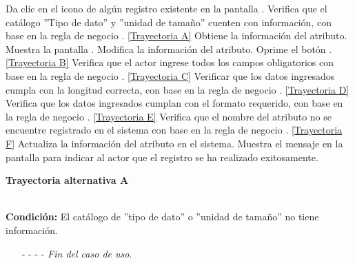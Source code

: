 	\begin{UCtrayectoria}
		\UCpaso[\UCactor] Da clic en el icono \editar de algún registro existente en la pantalla .
		\UCpaso[\UCsist] Verifica que el catálogo ''Tipo de dato'' y ''unidad de tamaño'' cuenten con información, con base en la regla de negocio . \hyperlink{CU7-1-1-2:TAA}{[Trayectoria A]}
		\UCpaso[\UCsist] Obtiene la información del atributo.
		\UCpaso[\UCsist] Muestra la pantalla .
		\UCpaso[\UCactor] Modifica la información del atributo. \label{CU7.1.2-P4}
		\UCpaso[\UCactor] Oprime el botón . \hyperlink{CU7-1-1-2:TAB}{[Trayectoria B]}
		\UCpaso[\UCsist] Verifica que el actor ingrese todos los campos obligatorios con base en la regla de negocio . \hyperlink{CU7-1-1-2:TAC}{[Trayectoria C]}
		\UCpaso[\UCsist] Verificar que los datos ingresados cumpla con la longitud correcta, con base en la regla de negocio . \hyperlink{CU7-1-1-2:TAD}{[Trayectoria D]}
		\UCpaso[\UCsist] Verifica que los datos ingresados cumplan con el formato requerido, con base en la regla de negocio . \hyperlink{CU7-1-1-2:TAE}{[Trayectoria E]}
		\UCpaso[\UCsist] Verifica que el nombre del atributo no se encuentre registrado en el sistema con base en la regla de negocio . \hyperlink{CU7-1-1-2:TAF}{[Trayectoria F]}
		\UCpaso[\UCsist] Actualiza la información del atributo en el sistema.
		\UCpaso[\UCsist] Muestra el mensaje  en la pantalla  para indicar al actor que el registro se ha realizado exitosamente.
	\end{UCtrayectoria}		
\hypertarget{CU7-1-1-2:TAA}{\textbf{Trayectoria alternativa A}}\\
\noindent \textbf{Condición:} El catálogo de ''tipo de dato'' o ''unidad de tamaño'' no tiene información.
\begin{enumerate}
	\UCpaso[\UCsist] Muestra el mensaje  en la pantalla  para indicar que no es posible realizar la operación debido a la falta de información necesaria para el sistema.
	\item[- -] - - {\em {Fin del caso de uso}}.%
\end{enumerate}
